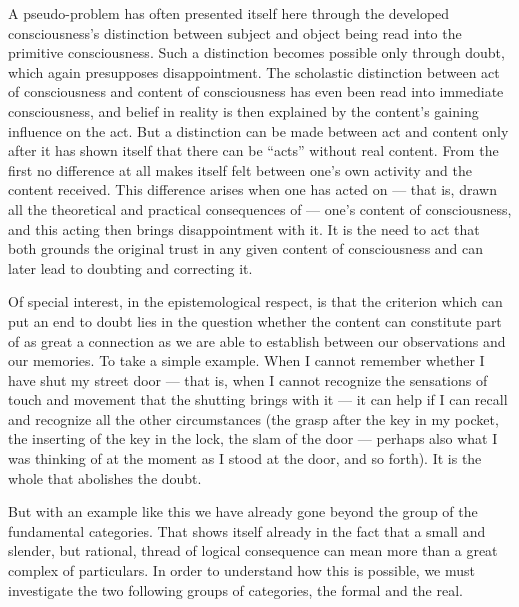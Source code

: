 \documentclass[12pt]{book}
\newcommand{\opage}[1]{\marginnote{\footnotesize\textit{[#1]}}}
\begin{document}
A pseudo-problem has often presented itself here through the de\-vel\-oped
con\-scious\-ness's distinction between subject and object being read into the
primitive consciousness. Such a distinction becomes possible only through doubt,
which again presupposes disappointment. The scholastic distinction between act of
consciousness and content of consciousness has even been read into immediate
consciousness, and belief in reality is then explained by the content's gaining
influence on the act. But a distinction can be made between act and content only
after it has shown itself that there can be ``acts'' without real content. From
the first no difference at all makes itself felt between one's own activity and
the content received. This difference arises when one has acted on --- that is,
drawn all the theoretical and practical consequences of --- one's content of
consciousness, and this acting then brings disappointment with it. It is the need
to act that both grounds the original trust in any given content of consciousness
and can later lead to doubting and correcting it.

Of special interest, in the epistemological respect, is that the criterion which
can put an end to doubt lies in the question whether the content can constitute
part of as great a connection as we are able to establish between our
observations and our memories. To take a simple example. When I cannot remember
whether I have shut my street door --- that is, when I cannot recognize the
sensations of touch and movement that the shutting brings with it --- it can help
if I can recall and recognize all the other circumstances (the grasp after the
key in my pocket, the inserting of the key in the lock, the slam of the door ---
perhaps also what \opage{31}I was thinking of at the moment as I stood at the door, and so
forth). It is the whole that abolishes the doubt.

But with an example like this we have already gone beyond the group of the
fundamental categories. That shows itself already in the fact that a small and
slender, but rational, thread of logical consequence can mean more than a great
complex of particulars. In order to understand how this is possible, we must
investigate the two following groups of categories, the formal and the real.


\end{document}
